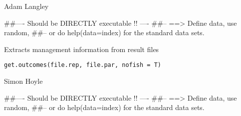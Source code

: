\documentclass[a4paper]{book}
\begin{document}
%
\begin{Author}\relax

Adam Langley
\end{Author}
%
\begin{Examples}
\begin{ExampleCode}
##---- Should be DIRECTLY executable !! ----
##-- ==>  Define data, use random,
##--	or do  help(data=index)  for the standard data sets.

\end{ExampleCode}
\end{Examples}
%
\begin{Description}\relax

Extracts management information from result files
\end{Description}
%
\begin{Usage}
\begin{verbatim}
get.outcomes(file.rep, file.par, nofish = T)
\end{verbatim}
\end{Usage}
%
\begin{Arguments}
\begin{ldescription}
\item[\code{file.rep}] 


\item[\code{file.par}] 


\item[\code{nofish}] 


\end{ldescription}
\end{Arguments}
%
\begin{Author}\relax

Simon Hoyle
\end{Author}
%
\begin{Examples}
\begin{ExampleCode}
##---- Should be DIRECTLY executable !! ----
##-- ==>  Define data, use random,
##--	or do  help(data=index)  for the standard data sets.

\end{ExampleCode}
\end{Examples}
\end{document}

